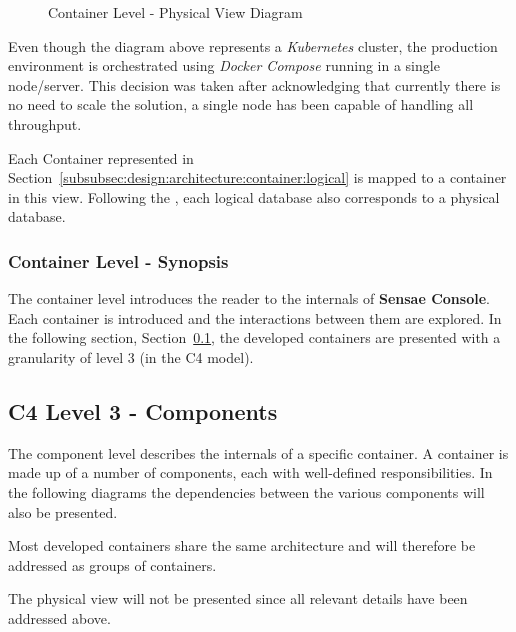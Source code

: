 \begin{figure}[H]
   \centering
   \resizebox{\columnwidth}{!}
   {
      
   }
   \caption[Container Level - Physical View Diagram]{Container Level - Physical View Diagram}
   \label{fig:design:architecture:container:physical:diagram}
\end{figure}

Even though the diagram above represents a \textit{Kubernetes} cluster, the production environment is orchestrated using \textit{Docker Compose} running in a single node/server. This decision was taken after acknowledging that currently there is no need to scale the solution, a single node has been capable of handling all throughput.

Each Container represented in Section~\ref{subsubsec:design:architecture:container:logical} is mapped to a container in this view. Following the , each logical database also corresponds to a physical database. 

\subsubsection{Container Level - Synopsis}
\label{subsubsec:design:architecture:container:synopsis}

The container level introduces the reader to the internals of \textbf{Sensae Console}. Each container is introduced and the interactions between them are explored.
In the following section, Section~\ref{subsec:design:architecture:components}, the developed containers are presented with a granularity of level 3 (in the C4 model).

\subsection{C4 Level 3 - Components}
\label{subsec:design:architecture:components}

The component level describes the internals of a specific container. A container is made up of a number of components, each with well-defined responsibilities. In the following diagrams the dependencies between the various components will also be presented.

Most developed containers share the same architecture and will therefore be addressed as groups of containers.

The physical view will not be presented since all relevant details have been addressed above.

